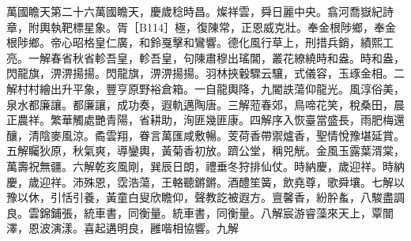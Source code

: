 \begin{pinyinscope}
萬國瞻天第二十六萬國瞻天，慶歲稔時昌。燦祥雲，舜日麗中央。翕河喬嶽紀詩章，附輿執靶標星象。胥［B114］極，復陳常，正恩威克壯。奉金根陟鄉，奉金根陟鄉。帝心昭格皇仁廣，和鈴戛擊和鸞響。德化風行草上，刑措兵銷，績熙工亮。一解春省秋省軫吾皇，軫吾皇，句陳肅穆出瑤閶，叢花繚繞時和盎。時和盎，閃龍旗，淠淠揚揚。閃龍旗，淠淠揚揚。羽林挾轂驟云驤，式儀容，玉琢金相。二解村村繪出升平象，豐亨原野裕倉箱。一自龍輿降，九閽詄蕩仰龍光。風淳俗美，泉水都廉讓。都廉讓，成功奏，遐軌邁陶唐。三解蒞春郊，鳥啼花笑，稅桑田，晨正農祥。繁華觸處艷青陽，省耕助，洵匪幾匪康。四解序入恢臺當盛長，雨肥梅還釀，清陰麥風涼。矞雲翔，眷言萬匯咸敷暢。芰荷香帶禦爐香，聖情悅豫堪延賞。五解矚狄原，秋氣爽，導鑾輿，黃菊香初放。躋公堂，稱兕觥。金風玉露葉湑棠，萬壽祝無疆。六解乾亥風剛，巽辰日朗，禮垂冬狩排仙仗。時納慶，歲迎祥。時納慶，歲迎祥。沛殊恩，霑浩蕩，王輅聽鏘鏘。酒醴笙簧，飲堯尊，歌舜壤。七解以豫以休，引恬引養，黃童白叟欣瞻仰，聲教訖被遐方。亶馨香，紛肸蚃，八駿盡調良。雲錦鋪張，統車書，同衡量。統車書，同衡量。八解宸游睿藻來天上，覃闓澤，恩波演漾。喜起遘明良，雝喈相協響。九解


\end{pinyinscope}
